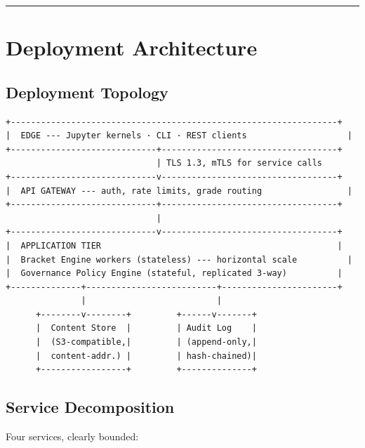 \documentclass[11pt,a4paper]{article}
\begin{document}
\begin{center}\rule{0.5\linewidth}{0.5pt}\end{center}

\hypertarget{deployment-architecture}{%
\section{Deployment Architecture}\label{deployment-architecture}}

\hypertarget{deployment-topology}{%
\subsection{Deployment Topology}\label{deployment-topology}}

\begin{Verbatim}[breaklines=true,breakanywhere=true]
+-----------------------------------------------------------------+
|  EDGE --- Jupyter kernels · CLI · REST clients                    |
+-----------------------------+-----------------------------------+
                              | TLS 1.3, mTLS for service calls
+-----------------------------v-----------------------------------+
|  API GATEWAY --- auth, rate limits, grade routing                 |
+-----------------------------+-----------------------------------+
                              |
+-----------------------------v-----------------------------------+
|  APPLICATION TIER                                               |
|  Bracket Engine workers (stateless) --- horizontal scale          |
|  Governance Policy Engine (stateful, replicated 3-way)          |
+--------------+--------------------------+-----------------------+
               |                          |
      +--------v--------+         +------v-------+
      |  Content Store  |         | Audit Log    |
      |  (S3-compatible,|         | (append-only,|
      |  content-addr.) |         | hash-chained)|
      +-----------------+         +--------------+
\end{Verbatim}

\hypertarget{service-decomposition}{%
\subsection{Service Decomposition}\label{service-decomposition}}

Four services, clearly bounded:
\end{document}
